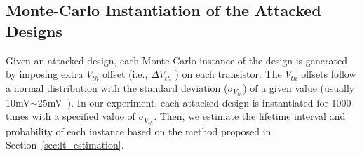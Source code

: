 \subsection{Monte-Carlo Instantiation of the Attacked Designs}
\label{sec:ins:mc_ins}
Given an attacked design, each Monte-Carlo instance of the design is generated by imposing extra $V_{th}$ offset (i.e., $\Delta V_{th}$ ) on each transistor. The $V_{th}$ offsets follow a normal distribution with the standard deviation ($\sigma_{V_{th}}$) of a given value (usually 10mV$\sim$25mV~\cite{han2011statistical}\cite{schlunder2017influence}). In our experiment, each attacked design is instantiated for 1000 times with a specified value of $\sigma_{V_{th}}$. Then, we estimate the lifetime interval and probability of each instance based on the method proposed in Section~\ref{sec:lt_estimation}. %

